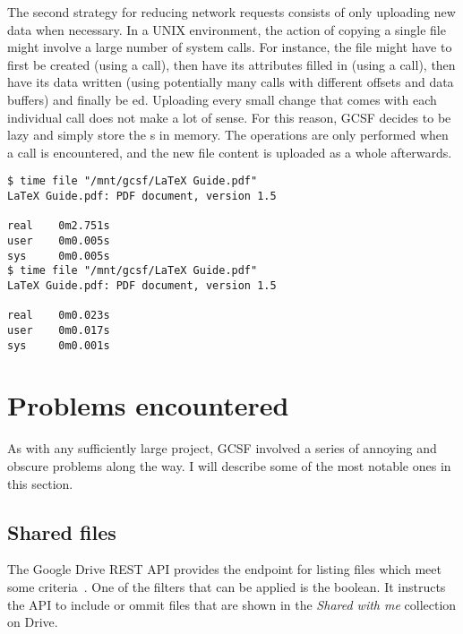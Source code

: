 The second strategy for reducing network requests consists of only uploading new data when necessary. In a UNIX environment, the action of copying a single file might involve a large number of system calls. For instance, the file might have to first be created (using a  call), then have its attributes filled in (using a  call), then have its data written (using potentially many  calls with different offsets and data buffers) and finally be ed. Uploading every small change that comes with each individual  call does not make a lot of sense. For this reason, GCSF decides to be lazy and simply store the s in memory. The operations are only performed when a  call is encountered, and the new file content is uploaded as a whole afterwards.


\begin{lstlisting}[basicstyle=\footnotesize\ttfamily,float,caption=File caching in action, frame=single, label=file_caching]
$ time file "/mnt/gcsf/LaTeX Guide.pdf"
LaTeX Guide.pdf: PDF document, version 1.5

real    0m2.751s
user    0m0.005s
sys     0m0.005s
$ time file "/mnt/gcsf/LaTeX Guide.pdf"
LaTeX Guide.pdf: PDF document, version 1.5

real    0m0.023s
user    0m0.017s
sys     0m0.001s
\end{lstlisting}

\section{Problems encountered} \label{problems_encountered}

As with any sufficiently large project, GCSF involved a series of annoying and obscure problems along the way. I will describe some of the most notable ones in this section.

\subsection{Shared files} \label{shared_files}

The Google Drive REST API provides the  endpoint for listing files which meet some criteria~\cite{files_list_call}. One of the filters that can be applied is the  boolean. It instructs the API to include or ommit files that are shown in the \emph{Shared with me} collection on Drive.

